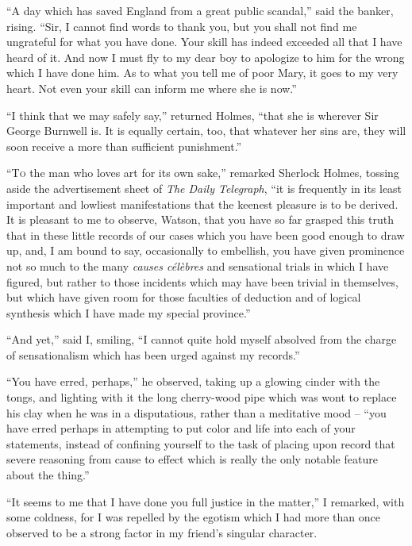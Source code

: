 “A day which has saved England from a great public
scandal,” said the banker, rising. “Sir, I cannot find words
to thank you, but you shall not find me ungrateful for what
you have done. Your skill has indeed exceeded all that I
have heard of it. And now I must fly to my dear boy to
apologize to him for the wrong which I have done him. As
to what you tell me of poor Mary, it goes to my very heart.
Not even your skill can inform me where she is now.”

“I think that we may safely say,” returned Holmes, “that
she is wherever Sir George Burnwell is. It is equally certain,
too, that whatever her sins are, they will soon receive a more
than sufficient punishment.”


“\textsc{To} the man who loves art for its own sake,” remarked
Sherlock Holmes, tossing aside the advertisement
sheet of \textit{The Daily Telegraph}, “it is
frequently in its least important and lowliest
manifestations that the keenest pleasure is to be derived. It
is pleasant to me to observe, Watson, that you have so far
grasped this truth that in these little records of our cases
which you have been good enough to draw up, and, I am
bound to say, occasionally to embellish, you have given prominence
not so much to the many \textit{causes célèbres} and sensational
trials in which I have figured, but rather to those incidents
which may have been trivial in themselves, but which have
given room for those faculties of deduction and of logical
synthesis which I have made my special province.”

“And yet,” said I, smiling, “I cannot quite hold myself
absolved from the charge of sensationalism which has been
urged against my records.”

“You have erred, perhaps,” he observed, taking up a glowing
cinder with the tongs, and lighting with it the long cherry-wood
pipe which was wont to replace his clay when he was in
a disputatious, rather than a meditative mood -- “you have
erred perhaps in attempting to put color and life into each of
your statements, instead of confining yourself to the task of
placing upon record that severe reasoning from cause to effect
which is really the only notable feature about the thing.”

“It seems to me that I have done you full justice in the
matter,” I remarked, with some coldness, for I was repelled
by the egotism which I had more than once observed to be a
strong factor in my friend’s singular character.


